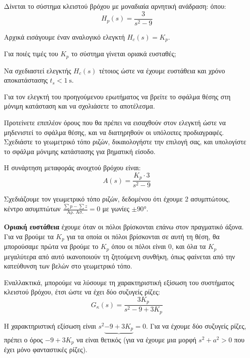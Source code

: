 \documentclass[11pt,a4paper,notitlepage,fleqn]{article}
\begin{document}
\begin{exercise}
Δίνεται το σύστημα κλειστού βρόχου με μοναδιαία αρνητική ανάδραση:
όπου:
\[
H_p(s) = \frac{3}{s^2-9}
\]

\begin{enumgreekparen}
	\item Αρχικά εισάγουμε έναν αναλογικό ελεγκτή \( H_c(s) = K_p \).
	
	Για ποιές τιμές του \( K_p \) το σύστημα γίνεται οριακά ευσταθές;
	
	\item Να σχεδιαστεί ελεγκτής \( H_c(s) \) τέτοιος ώστε να έχουμε ευστάθεια και χρόνο
	αποκατάστασης \( t_s < \SI{1}{\second} \).
	
	\item Για τον ελεγκτή του προηγούμενου ερωτήματος να βρείτε το σφάλμα θέσης στη μόνιμη
	κατάσταση και να σχολιάσετε το αποτέλεσμα.
	
	\item Προτείνετε επιπλέον όρους που θα πρέπει να εισαχθούν στον ελεγκτή ώστε να
	μηδενιστεί το σφάλμα θέσης, και να διατηρηθούν οι υπόλοιπες προδιαγραφές.
	Σχεδιάστε το γεωμετρικό τόπο ριζών, δικαιολογήστε την επιλογή σας, και υπολογίστε το
	σφάλμα μόνιμης κατάστασης για βηματική είσοδο.
\end{enumgreekparen}

\tcblower
\begin{enumgreekparen}
	\item Η συνάρτηση μεταφοράς ανοιχτού βρόχου είναι:\[
	A(s) = \frac{K_p\cdot 3}{s^2-9}
	\]
	
	Σχεδιάζουμε τον γεωμετρικό τόπο ριζών, δεδομένου ότι έχουμε 2 ασυμπτώτους, κέντρο
	ασυμπτώτων \( \frac{\sum p -\sum z}{\text{Αρ. Ασ.}} = 0 \) με γωνίες \( \pm \ang{90} \).
	
	\textbf{Οριακή ευστάθεια} έχουμε όταν οι πόλοι βρίσκονται επάνω στον πραγματικό άξονα.
	Για να βρούμε τα \( K_p \) για τα οποία οι πόλοι βρίσκονται σε αυτή τη θέση, θα μπορούσαμε
	πρώτα να βρούμε το \( K_p \) όπου οι πόλοι είναι 0, και όλα τα \( K_p \) μεγαλύτερα
	από αυτό ικανοποιούν τη ζητούμενη συνθήκη, όπως φαίνεται από την κατεύθυνση των βελών
	στο γεωμετρικό τόπο.
	
	Εναλλακτικά, μπορούμε να λύσουμε τη χαρακτηριστική εξίσωση του συστήματος κλειστού
	βρόχου, έτσι ώστε να έχει δύο συζυγείς ρίζες:
	\[
	G_κ(s) = \frac{3K_p}{s^2-9+3K_p}
	\]
	
	Η χαρακτηριστική εξίσωση είναι \( s^2\underbrace{-9+3K_p} = 0 \). Για να έχουμε δύο
	συζυγείς ρίζες, πρέπει ο όρος \( -9+3K_p \) να είναι θετικός (για να έχουμε μια
	μορφή \( s^2+a^2 > 0 \) που έχει μόνο φανταστικές ρίζες).
	

\end{enumgreekparen}
\end{exercise}
\end{document}
